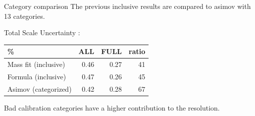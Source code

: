 \documentclass[a4paper]{beamer}
\begin{document}
  \begin{frame}{Category comparison}
    The previous inclusive results are compared to asimov with 13 categories.

    \begin{center}
      Total Scale Uncertainty :\\
      \begin{tabular}{l|rrr}
        \% & ALL & FULL & ratio\\
        \hline
        Mass fit (inclusive) & 0.46 & 0.27 & 41\\
        Formula (inclusive) & 0.47 & 0.26 & 45\\
        Asimov (categorized) & 0.42 & 0.28 & 67\\
      \end{tabular}
    \end{center}

    Bad calibration categories have a higher contribution to the resolution.
  \end{frame}
\end{document}

